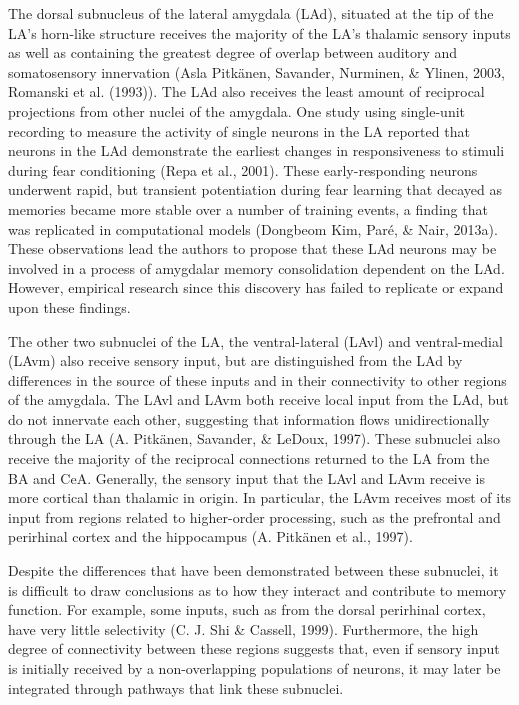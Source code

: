 \documentclass[12pt,a4paper,]{report}
\begin{document}
The dorsal subnucleus of the lateral amygdala (LAd), situated at the tip
of the LA's horn-like structure receives the majority of the LA's
thalamic sensory inputs as well as containing the greatest degree of
overlap between auditory and somatosensory innervation (Asla Pitkänen,
Savander, Nurminen, \& Ylinen, 2003, Romanski et al. (1993)). The LAd
also receives the least amount of reciprocal projections from other
nuclei of the amygdala. One study using single-unit recording to measure
the activity of single neurons in the LA reported that neurons in the
LAd demonstrate the earliest changes in responsiveness to stimuli during
fear conditioning (Repa et al., 2001). These early-responding neurons
underwent rapid, but transient potentiation during fear learning that
decayed as memories became more stable over a number of training events,
a finding that was replicated in computational models (Dongbeom Kim,
Paré, \& Nair, 2013a). These observations lead the authors to propose
that these LAd neurons may be involved in a process of amygdalar memory
consolidation dependent on the LAd. However, empirical research since
this discovery has failed to replicate or expand upon these findings.

The other two subnuclei of the LA, the ventral-lateral (LAvl) and
ventral-medial (LAvm) also receive sensory input, but are distinguished
from the LAd by differences in the source of these inputs and in their
connectivity to other regions of the amygdala. The LAvl and LAvm both
receive local input from the LAd, but do not innervate each other,
suggesting that information flows unidirectionally through the LA (A.
Pitkänen, Savander, \& LeDoux, 1997). These subnuclei also receive the
majority of the reciprocal connections returned to the LA from the BA
and CeA. Generally, the sensory input that the LAvl and LAvm receive is
more cortical than thalamic in origin. In particular, the LAvm receives
most of its input from regions related to higher-order processing, such
as the prefrontal and perirhinal cortex and the hippocampus (A. Pitkänen
et al., 1997).

Despite the differences that have been demonstrated between these
subnuclei, it is difficult to draw conclusions as to how they interact
and contribute to memory function. For example, some inputs, such as
from the dorsal perirhinal cortex, have very little selectivity (C. J.
Shi \& Cassell, 1999). Furthermore, the high degree of connectivity
between these regions suggests that, even if sensory input is initially
received by a non-overlapping populations of neurons, it may later be
integrated through pathways that link these subnuclei.
\end{document}
